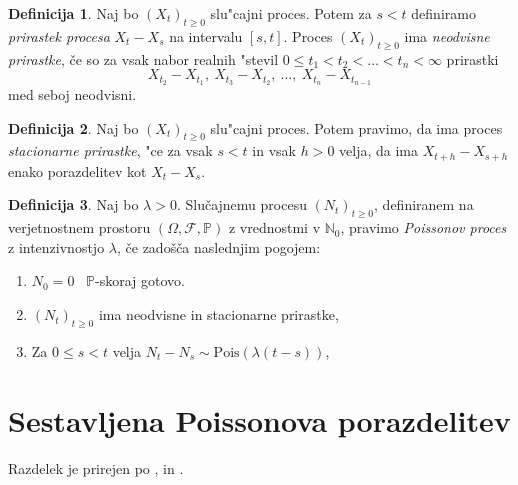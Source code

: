 \documentclass[12pt, a4paper, reqno]{amsart}
\theoremstyle{definition}
\newtheorem{definicija}{Definicija}[section]
\newtheorem{opomba}[definicija]{Opomba}
\theoremstyle{plain}
\newcommand{\N}{\mathbb{N}}
\newcommand{\Prob}{\mathbb{P}}
\newcommand{\1}{\mathds{1}}
\newcommand{\Pois}[1]{\text{Pois}(#1)}
\begin{document}
    \begin{definicija}
        Naj bo $(X_t)_{t\geq0}$ slu"cajni proces. Potem za $s < t$ definiramo
        \textit{prirastek procesa} $X_t - X_s$ na intervalu $[s, t]$. Proces $(X_t)_{t\geq0}$ ima 
        \textit{neodvisne prirastke}, če so za vsak nabor realnih "stevil
        $0 \leq t_1 < t_2 < \ldots < t_n < \infty$ prirastki
        $$
            X_{t_2} - X_{t_1}, \ X_{t_3} - X_{t_2}, \ \ldots, \ X_{t_n} - X_{t_{n-1}}
        $$
        med seboj neodvisni.
        \label{def:prirastek}
    \end{definicija}

    \begin{definicija}
        Naj bo $(X_t)_{t\geq0}$ slu"cajni proces. Potem pravimo, da ima proces
        \textit{stacionarne prirastke}, "ce za vsak $s < t$ in vsak $h > 0$ velja, 
        da ima $X_{t+h} - X_{s+h}$ enako porazdelitev kot $X_t - X_s$.
        \label{def:stacPrir}
    \end{definicija}

    \begin{definicija}
        Naj bo $\lambda > 0$. Slučajnemu procesu $(N_t)_{t\geq 0}$, definiranem na verjetnostnem 
        prostoru $(\Omega, \mathcal{F}, \mathbb{P})$ z vrednostmi v $\N_0$, pravimo 
        \textit{Poissonov proces} z intenzivnostjo $\lambda$, če zadošča naslednjim pogojem:
        \begin{enumerate}
            \item $N_0 = 0$ \ $\Prob$-skoraj gotovo.
            \item $(N_t)_{t\geq 0}$ ima neodvisne in stacionarne prirastke,
            \item Za $0 \leq s < t$ velja $ N_t - N_s \sim\Pois{\lambda(t - s)}$,
        \end{enumerate}
        \label{def:HPP}
    \end{definicija}

\section{Sestavljena Poissonova porazdelitev}

    \noindent
    Razdelek je prirejen po \cite{1}, \cite{2} in \cite{3}.
\end{document}
